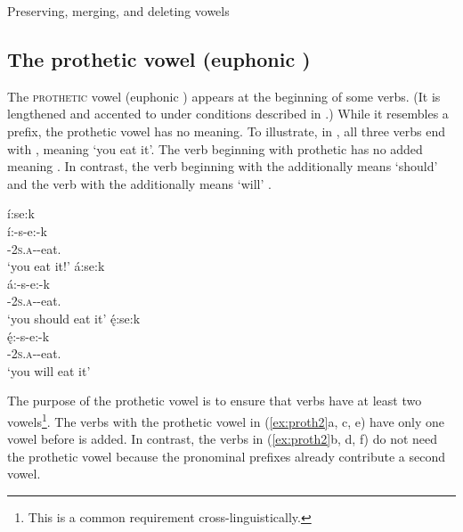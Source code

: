 \begin{CayugaRelated}
\item Preserving, merging, and deleting vowels 
\end{CayugaRelated}

\subsection{The prothetic vowel (euphonic )} \label{Euphonic I}
The \textsc{prothetic} vowel (euphonic ) appears at the beginning of some verbs. (It is lengthened and accented to  under conditions described in .) While it resembles a prefix, the prothetic vowel has no meaning. To illustrate, in , all three verbs end with , meaning ‘you eat it’. The verb beginning with prothetic  has no added meaning . In contrast, the verb beginning with the  \textsc{\indefinite} additionally means ‘should’  and the verb with the  \textsc{\future} additionally means ‘will’ .

\ea\label{ex:proth}
\ea í:se:k\\\label{ex:protha}
\gll í:-s-e:-k\\
 {\prothetic}-\textsc{2s.a}-{\joinerE}-eat.{\zeropunctual}\\
\glt `you eat it!'
\ex á:se:k\\\label{ex:prothb}
\gll á:-s-e:-k\\
 {\indefinite}-\textsc{2s.a}-{\joinerE}-eat.{\zeropunctual}\\
\glt `you should eat it'
\ex ę́:se:k\\\label{ex:prothc}
\gll ę́:-s-e:-k\\
 \fut-\textsc{2s.a}-{\joinerE}-eat.{\zeropunctual}\\
\glt `you will eat it'
\z
\z

The purpose of the prothetic vowel is to ensure that verbs have at least two vowels\footnote{This is a common requirement cross-linguistically.}. The verbs with the prothetic vowel in (\ref{ex:proth2}a, c, e) have only one vowel before  is added. In contrast, the verbs in (\ref{ex:proth2}b, d, f) do not need the prothetic vowel because the pronominal prefixes already contribute a second vowel.


